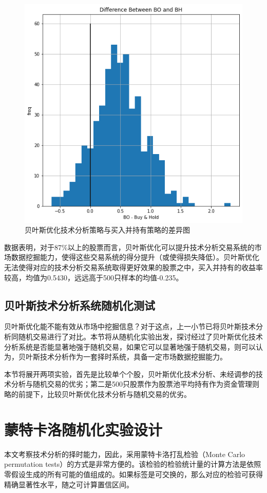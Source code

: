 \documentclass[twoside,longtitle]{LZUthesis}
\begin{document}
\begin{figure}[h]
    \centering
    \includegraphics[scale=0.7]{fig5-3.png}
    \caption{贝叶斯优化技术分析策略与买入并持有策略的差异图}
    \label{fig:my_label}
\end{figure}
数据表明，对于87\%以上的股票而言，贝叶斯优化可以提升技术分析交易系统的市场数据挖掘能力，使得这些交易系统的得分提升（或使得损失降低）。贝叶斯优化无法使得对应的技术分析交易系统取得更好效果的股票之中，买入并持有的收益率较高，均值为0.5430，远远高于500只样本的均值-0.235。

\subsection{贝叶斯技术分析系统随机化测试}
贝叶斯优化能不能有效从市场中挖掘信息？对于这点，上一小节已将贝叶斯技术分析同随机交易进行了对比。本节将从随机化实验出发，探讨经过了贝叶斯优化技术分析系统是否能显著地强于随机交易，如果它可以显著地强于随机交易，则可以认为，贝叶斯技术分析作为一套择时系统，具备一定市场数据挖掘能力。

本节将展开两项实验，首先是比较单个个股，贝叶斯优化技术分析、未经调参的技术分析与随机交易的优劣；第二是500只股票作为股票池平均持有作为资金管理则略的前提下，比较贝叶斯优化技术分析与随机交易的优劣。

\section{蒙特卡洛随机化实验设计}
本文考察技术分析的择时能力，因此，采用蒙特卡洛打乱检验（Monte Carlo permutation tests）的方式是非常方便的\cite{dwass1957modified}。该检验的检验统计量的计算方法是依照零假设生成的所有可能的值组成的。如果标签是可交换的，那么对应的检验可获得精确显著性水平，随之可计算置信区间。
\end{document}
